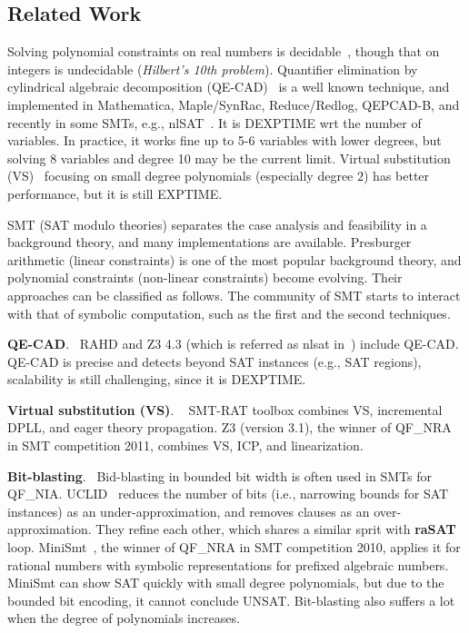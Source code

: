 \documentclass[runningheads,a4paper,oribibl]{llncs}
\begin{document}
\subsection*{Related Work} \label{sec:relate}

Solving polynomial constraints on real numbers is decidable~\cite{tarski}, 
though that on integers is undecidable ({\em Hilbert's 10th problem}). 
Quantifier elimination by cylindrical algebraic decomposition (QE-CAD)~\cite{qecad} 
is a well known technique, and 
implemented in Mathematica, Maple/SynRac, Reduce/Redlog, QEPCAD-B, and recently 
in some SMTs, e.g., nlSAT~\cite{Jovanovic13}. 
It is DEXPTIME wrt the number of variables. In practice, it works fine up to 5-6 variables 
with lower degrees, but solving 8 variables and degree 10 may be the current limit. 
Virtual substitution (VS)~\cite{vsmethod} focusing on small degree polynomials 
(especially degree $2$) has better performance, but it is still EXPTIME. 

SMT (SAT modulo theories) separates the case analysis and feasibility in a background theory, 
and many implementations are available. 
Presburger arithmetic (linear constraints) is one of the most popular background theory, and 
polynomial constraints (non-linear constraints) become evolving. 
Their approaches can be classified as follows. 
The community of SMT starts to interact with that of symbolic computation, 
such as the first and the second techniques. 

\medskip \noindent
\textbf{QE-CAD}. ~RAHD \cite{rahd} and 
Z3 4.3 (which is referred as nlsat in~\cite{Jovanovic13}) include QE-CAD. 
QE-CAD is precise and detects beyond SAT instances (e.g., SAT regions), 
scalability is still challenging, since it is DEXPTIME. 

\medskip \noindent
\textbf{Virtual substitution (VS)}. ~
SMT-RAT toolbox \cite{smtrat}\cite{vssmt} combines 
VS, incremental DPLL, and %
eager theory propagation. 
Z3 (version 3.1), the winner of QF\_NRA in SMT competition 2011, 
combines VS, ICP, and linearization.

\medskip \noindent
\textbf{Bit-blasting}. ~Bid-blasting in bounded bit width is often used in SMTs for QF\_NIA. 
UCLID~\cite{uclid} reduces the number of bits (i.e., narrowing bounds for SAT instances) 
as an under-approximation, and removes clauses as an over-approximation. 
They refine each other, which shares a similar sprit with {\bf raSAT} loop. 
MiniSmt~\cite{minismt}, the winner of QF\_NRA in SMT competition 2010, 
applies it for rational numbers with symbolic representations for prefixed algebraic numbers. 
MiniSmt can show SAT quickly with small degree polynomials, but due to the bounded bit encoding, 
it cannot conclude UNSAT.
Bit-blasting also suffers a lot when the degree of polynomials increases. 
\end{document}
